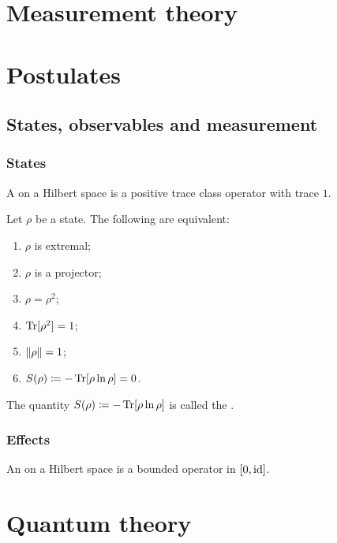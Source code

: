 \chapter{Measurement theory}

\chapter{Postulates}

\section{States, observables and measurement}
\subsection{States}
\begin{definition}
A  on a Hilbert space is a positive trace class operator with trace $1$.
\end{definition}

\begin{proposition}
Let $\rho$ be a state. The following are equivalent:
\begin{enumerate}
\item $\rho$ is extremal;
\item $\rho$ is a projector;
\item $\rho = \rho^2$;
\item $\operatorname{Tr}[\rho^2] = 1$;
\item $\lVert\rho\rVert = 1$;
\item $S(\rho) \coloneqq -\operatorname{Tr}[\rho\ln\rho] = 0$.
\end{enumerate}
\end{proposition}
The quantity $S(\rho) \coloneqq -\operatorname{Tr}[\rho\ln\rho]$ is called the .

\subsection{Effects}
\begin{definition}
An  on a Hilbert space is a bounded operator in $[0,\operatorname{id}]$.
\end{definition}

\chapter{Quantum theory}
